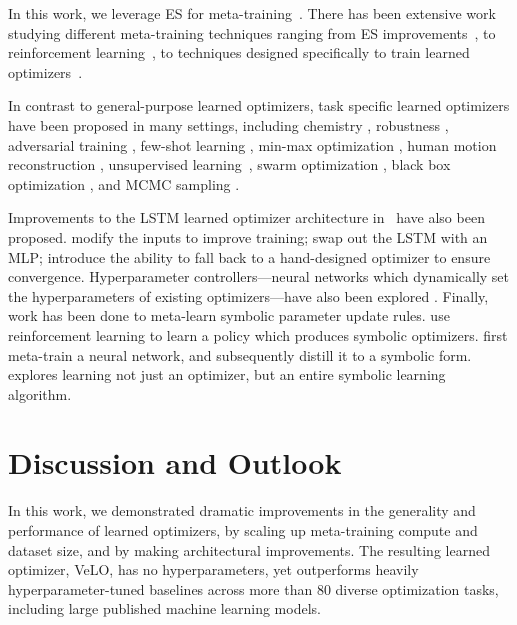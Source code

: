 \documentclass[11pt]{article}
\begin{document}
In this work, we leverage ES for meta-training~\citep{rechenberg1973evolutionsstrategie, nesterov2011random, salimans2017evolution}.
There has been extensive work studying different meta-training techniques ranging from ES improvements~\citep{maheswaranathan2019guided, metz2019understanding, pmlr-v139-vicol21a}, to reinforcement learning~\citep{li2016learning, li2017learning}, to techniques designed specifically to train learned optimizers~\citep{lv2017learning,chen2020training}.

In contrast to general-purpose learned optimizers, task specific learned optimizers have been proposed in many settings, including chemistry \citep{learn2hop}, robustness \citep{metz2019using}, adversarial training \citep{xiong2020improved},
few-shot learning \citep{ravi2016optimization},
min-max optimization \citep{shen2021learning},
human motion reconstruction \citep{gartner2022prep},
unsupervised learning~\citep{metz2018learning},
swarm optimization \citep{cao2019learning},
black box optimization \citep{chen2016learning},
and MCMC sampling \citep{levy2017generalizing,wang2017meta,gong2018meta}.

Improvements to the LSTM learned optimizer architecture in~\citet{andrychowicz2016learning} have also been proposed. \citet{lv2017learning} modify the inputs to improve training; \citet{metz2019understanding} swap out the LSTM with an MLP; \citet{premont2022simple} introduce the ability to fall back to a hand-designed optimizer to ensure convergence.
Hyperparameter controllers---neural networks which dynamically set the hyperparameters of existing optimizers---have also been explored \citep{daniel2016learning, xu2019learning, almeida2021generalizable}. 
Finally, work has been done to meta-learn symbolic parameter update rules.
\citet{Bello17} use reinforcement learning to learn a policy which produces symbolic optimizers.
\citet{zheng2022symbolic} first meta-train a neural network, and subsequently distill it to a symbolic form.
\citet{real2020automl} explores learning not just an optimizer, but an entire symbolic learning algorithm.

\section{Discussion and Outlook} 
In this work, we demonstrated dramatic improvements in the generality and performance of learned optimizers, by scaling up meta-training compute and dataset size, and by making architectural improvements.
The resulting learned optimizer, VeLO, has no hyperparameters, yet outperforms heavily hyperparameter-tuned baselines across more than 80 diverse optimization tasks, including large published machine learning models.
\end{document}
